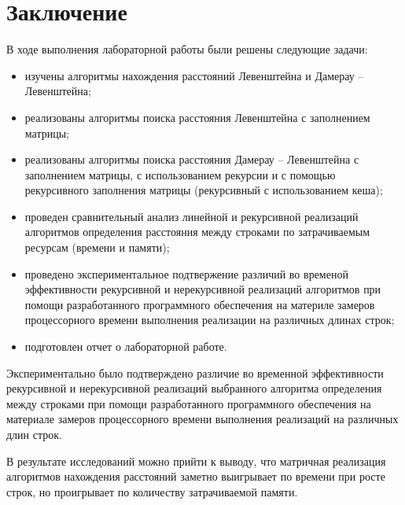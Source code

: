 \chapter*{Заключение}

В ходе выполнения лабораторной работы были решены следующие задачи:

\begin{itemize}
    \item изучены алгоритмы нахождения расстояний Левенштейна и Дамерау -- Левенштейна;
	\item реализованы алгоритмы поиска расстояния Левенштейна с заполнением матрицы;
	\item реализованы алгоритмы поиска расстояния Дамерау -- Левенштейна с заполнением матрицы, с использованием рекурсии и с помощью рекурсивного заполнения матрицы (рекурсивный с использованием кеша);
	\item проведен сравнительный анализ линейной и рекурсивной реализаций алгоритмов определения расстояния между строками по затрачиваемым ресурсам (времени и памяти);
	\item проведено экспериментальное подтвержение различий во временой эффективности рекурсивной и нерекурсивной реализаций алгоритмов при помощи разработанного программного обеспечения на материле замеров процессорного времени выполнения реализации на различных длинах строк;
	\item подготовлен отчет о лабораторной работе.
\end{itemize}

Экспериментально было подтверждено различие во временной эффективности рекурсивной и нерекурсивной реализаций выбранного алгоритма определения между строками при помощи разработанного программного обеспечения на материале замеров процессорного времени выполнения реализаций на различных длин строк.

В результате исследований можно прийти к выводу, что матричная реализация алгоритмов нахождения расстояний заметно выигрывает по времени при росте строк, но проигрывает по количеству затрачиваемой памяти.
